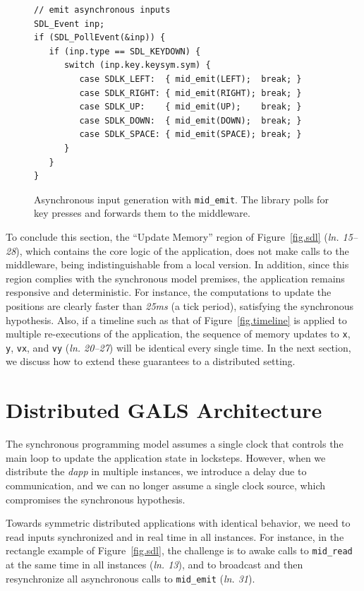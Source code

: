 \documentclass[sigplan,screen]{acmart}
\newcommand{\lin}[1]{(\emph{ln. #1}\xspace)}
\newcommand{\dapp}{\emph{dapp}\xspace}
\begin{document}
\begin{figure}[t]
{\scriptsize
\begin{verbatim}
// emit asynchronous inputs
SDL_Event inp;
if (SDL_PollEvent(&inp)) {
   if (inp.type == SDL_KEYDOWN) {
      switch (inp.key.keysym.sym) {
         case SDLK_LEFT:  { mid_emit(LEFT);  break; }
         case SDLK_RIGHT: { mid_emit(RIGHT); break; }
         case SDLK_UP:    { mid_emit(UP);    break; }
         case SDLK_DOWN:  { mid_emit(DOWN);  break; }
         case SDLK_SPACE: { mid_emit(SPACE); break; }
      }
   }
}
\end{verbatim}
}
  \caption{
    \label{fig.input}
    Asynchronous input generation with \texttt{mid\_emit}.
    The library polls for key presses and forwards them to the middleware.
  }
\end{figure}

To conclude this section, the ``Update Memory'' region of Figure~\ref{fig.sdl}
\lin{15--28}, which contains the core logic of the application, does not make
calls to the
middleware, being indistinguishable from a local version.
In addition, since this region complies with the synchronous model premises,
the application remains responsive and deterministic.
For instance, the computations to update the positions are clearly faster than
\emph{25ms} (a tick period), satisfying the synchronous hypothesis.
Also, if a timeline such as that of Figure~\ref{fig.timeline} is applied to
multiple re-executions of the application, the sequence of memory updates to
\texttt{x}, \texttt{y}, \texttt{vx}, and \texttt{vy} \lin{20--27} will be
identical every single time.
In the next section, we discuss how to extend these guarantees to a distributed
setting.

\section{Distributed GALS Architecture}
\label{sec.gals}

The synchronous programming model assumes a single clock that controls the main
loop to update the application state in locksteps.
However, when we distribute the \dapp in multiple instances, we introduce a
delay due to communication, and we can no longer assume a single clock source,
which compromises the synchronous hypothesis.

Towards symmetric distributed applications with identical behavior, we need to
read inputs synchronized and in real time in all instances.
For instance, in the rectangle example of Figure~\ref{fig.sdl}, the challenge
is
    to awake calls to \texttt{mid\_read} at the same time in all instances \lin{13}, and
    to broadcast and then resynchronize all asynchronous calls to \texttt{mid\_emit} \lin{31}.
\end{document}
